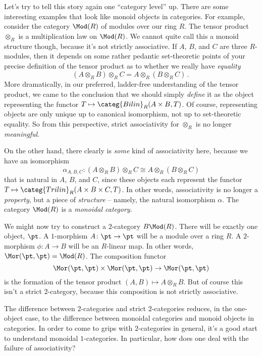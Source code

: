 Let's try to tell this story again one \enquote{category level} up.
There are some interesting examples that look like monoid objects in categories.
For example, consider the category $\Mod(R)$ of modules over our ring $R$.
The tensor product $\otimes_R$ is a multiplication law on $\Mod(R)$.
We cannot quite call this a monoid structure though, because it's not strictly associative.
If $A$, $B$, and $C$ are three $R$-modules, then it depends on some rather pedantic set-theoretic points of your precise definition of the tensor product as to whether we really have \emph{equality}
\[
  (A \otimes_R B) \otimes_R C = A \otimes_R (B \otimes_R C) \period
\]
More dramatically, in our preferred, ladder-free understanding of the tensor product, we came to the conclusion that we should simply \emph{define} it as the object representing the functor $T \mapsto \categ{Bilin}_R(A \times B,T)$.
Of course, representing objects are only unique up to canonical isomorphism, not up to set-theoretic equality.
So from this perspective, strict associativity for $\otimes_R$ is no longer \emph{meaningful}.

On the other hand, there clearly is \emph{some} kind of associativity here, because we have an isomorphism
\[
  \alpha_{A,B,C} \colon (A \otimes_R B) \otimes_R C \cong A \otimes_R (B \otimes_R C)
\]
that is natural in $A$, $B$, and $C$,
since these objects each represent the functor $T \mapsto \categ{Trilin}_R(A \times B \times C, T)$.
In other words, associativity is no longer a \emph{property}, but a piece of \emph{structure} --
namely, the natural isomorphism $\alpha$.
The category $\Mod(R)$ is a \emph{monoidal category}.

We might now try to construct a $2$-category $B\Mod(R)$. 
There will be exactly one object, $\pt$.
A $1$-morphism $A \colon \pt \to \pt$ will be a module over a ring $R$.
A $2$-morphism $\phi \colon A \to B$ will be an $R$-linear map.
In other words, $\Mor(\pt,\pt) = \Mod(R)$.
The composition functor
\[
  \Mor(\pt, \pt) \times \Mor(\pt,\pt) \to \Mor(\pt,\pt)
\]
is the formation of the tensor product $(A,B) \mapsto A \otimes_R B$.
But of course this isn't a strict $2$-category, because this composition is not strictly associative.

The difference between $2$-categories and strict $2$-categories reduces, in the one-object case, to the difference between monoidal categories and monoid objects in categories.
In order to come to grips with $2$-categories in general, it's a good start to understand monoidal $1$-categories.
In particular, how does one deal with the failure of associativity?

